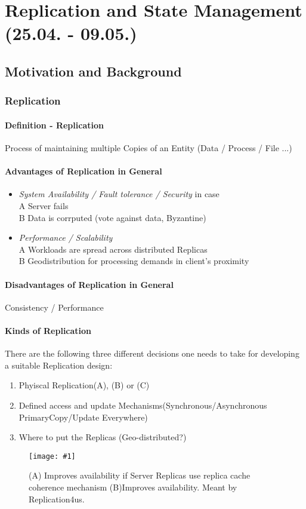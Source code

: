 \documentclass[a4paper,12pt]{article}%
\newcommand{\grafikHalf}[2]{\begin{figure}[!htb]
		\noindent\texttt{[image: \#1]}
		\caption{\textrm{#2}}%
	\end{figure}}
\begin{document}
 \section{Replication and State Management\\ (25.04. - 09.05.)}


\subsection{Motivation and Background}

\subsubsection{Replication}
\paragraph{Definition - Replication}
Process of maintaining multiple Copies of an Entity (Data / Process / File ...)

\paragraph{Advantages of Replication in General}
\begin{itemize}
	\item {\it System Availability / Fault tolerance / Security} in case \\
	A \quad Server fails \\
	B \quad Data is corrputed (vote against data, Byzantine)
	\item {\it Performance / Scalability } \\
	A \quad Workloads are spread across distributed Replicas \\
	B \quad Geodistribution for processing demands in client's proximity
\end{itemize} 

\paragraph{Disadvantages of Replication in General}
 Consistency / Performance
\paragraph{Kinds of Replication}
There are the following three different decisions one needs to take for developing a suitable Replication design:
\begin{enumerate}
 \item \glqq Phyiscal Replication\grqq (A), (B) or (C)
 \item Defined access and update Mechanisms(Synchronous/Asynchronous PrimaryCopy/Update Everywhere)
 \item Where to put the Replicas (Geo-distributed?)
\end{enumerate}
\grafikHalf{src/Grafik01}{(A) Improves availability if Server Replicas use replica cache coherence mechanism
	(B)Improves availability. Meant by \glqq Replication\grqq 4us.}
\end{document}
